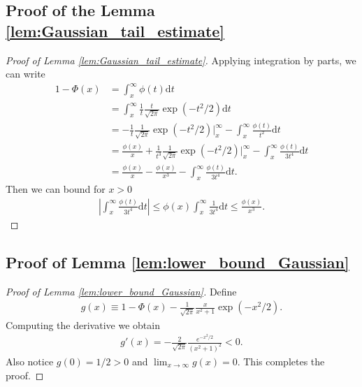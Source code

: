 \documentclass[12pt]{article}
\theoremstyle{definition}
\begin{document}
\subsection{Proof of the Lemma \ref{lem:Gaussian_tail_estimate}}

  \begin{proof}[Proof of Lemma \ref{lem:Gaussian_tail_estimate}]
    Applying integration by parts, we can write 
    \begin{align*}
      1-\Phi(x)
      &
      =\int_{x}^{\infty}\phi(t)\mathrm{d}t\\
      &
      =\int_{x}^{\infty}\frac{1}{t}\frac{t}{\sqrt{2\pi}}\exp(-t^2/2)\mathrm{d}t\\
      &
      =-\frac{1}{t}\frac{1}{\sqrt{2\pi}}\exp(-t^2/2)\bigg|_{x}^{\infty}-\int_{x}^{\infty}\frac{\phi(t)}{t^2}\mathrm{d}t\\
      &
      =\frac{\phi(x)}{x}+\frac{1}{t^3}\frac{1}{\sqrt{2\pi}}\exp(-t^2/2)\bigg|_x^{\infty}-\int_x^{\infty}\frac{\phi(t)}{3t^4}\mathrm{d}t\\
      &
      =\frac{\phi(x)}{x}-\frac{\phi(x)}{x^3}-\int_x^{\infty}\frac{\phi(t)}{3t^4}\mathrm{d}t.
    \end{align*}
    Then we can bound for $x>0$
    \begin{align*}
      \left|\int_{x}^{\infty}\frac{\phi(t)}{3t^4}\mathrm{d}t\right|\leq \phi(x)\int_{x}^{\infty}\frac{1}{3t^4}\mathrm{d}t\leq \frac{\phi(x)}{x^3}.
    \end{align*}
  \end{proof}


    
\subsection{Proof of Lemma \ref{lem:lower_bound_Gaussian}}

\begin{proof}[Proof of Lemma \ref{lem:lower_bound_Gaussian}]
  Define 
  \begin{align*}
	g(x)\equiv 1-\Phi(x)-\frac{1}{\sqrt{2\pi}}\frac{x}{x^2+1}\exp(-x^2/2).
  \end{align*}
  Computing the derivative we obtain 
  \begin{align*}
	g'(x)=-\frac{2}{\sqrt{2\pi}}\frac{e^{-x^2/2}}{(x^2+1)^2}<0.
  \end{align*}
  Also notice $g(0)=1/2>0$ and $\lim_{x\rightarrow\infty}g(x)=0$. This completes the proof.
\end{proof}
\end{document}
